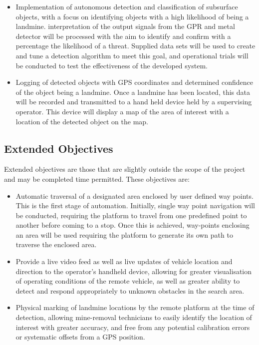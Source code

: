\documentclass[main.tex]{subfiles}
\begin{document}
\begin{itemize}
\item Implementation of autonomous detection and classification of subsurface objects, with a focus on identifying objects with a high likelihood of being a landmine. 
interpretation of the output signals from the GPR and metal detector will be processed with the aim to identify and confirm with a percentage the likelihood of a threat. %
Supplied data sets will be used to create and tune a detection algorithm to meet this goal, and operational trials will be conducted to test the effectiveness of the developed system.
\item Logging of detected objects with GPS coordinates and determined confidence of the object being a landmine. Once a landmine has been located, this data will be recorded and transmitted to a hand held device held by a supervising operator. This device will display a map of the area of interest with a location of the detected object on the map.
\end{itemize}

\subsection{Extended Objectives}
Extended objectives are those that are slightly outside the scope of the project and may be completed time permitted. These objectives are:

\begin{itemize}
\item Automatic traversal of a designated area enclosed by user defined way points. This is the first stage of automation. Initially, single way point navigation will be conducted, requiring the platform to travel from one predefined point to another before coming to a stop. Once this is achieved, way-points enclosing an area will be used requiring the platform to generate its own path to traverse the enclosed area.
\item Provide a live video feed as well as live updates of vehicle location and direction to the operator's handheld device, allowing for greater visualisation of operating conditions of the remote vehicle, as well as greater ability to detect and respond appropriately to unknown obstacles in the search area.
\item Physical marking of landmine locations by the remote platform at the time of detection, allowing mine-removal technicians to easily identify the location of interest with greater accuracy, and free from any potential calibration errors or systematic offsets from a GPS position.
\end{itemize}
\end{document}
